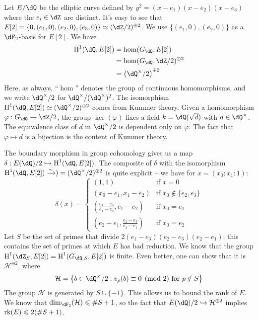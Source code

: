 \documentclass{article}
\begin{document}
\begin{example}[descent]
Let $E/\dQ$ be the elliptic curve defined by $y^2=(x-e_1)(x-e_2)(x-e_3)$ where 
the $e_i\in \dZ$ are distinct. It's easy to see that 
$E[2]=\{0,(e_1,0),(e_2,0),(e_3,0)\}\simeq (\dZ/2)^{\oplus 2}$. We use 
$\{(e_1,0),(e_2,0)\}$ as a $\dF_2$-basis for $E[2]$. We have 
\begin{align*}
  \h^1(\dQ,E[2]) &= \hom(G_\dQ,E[2]) \\
    &= \hom(G_\dQ,\dZ/2)^{\oplus 2} \\
    &= \left(\dQ^\times/2\right)^{\oplus 2}
\end{align*}
Here, as always, ``$\hom$'' denotes the group of continuous homomorphisms, and 
we write $\dQ^\times/2$ for $\dQ^\times/(\dQ^\times)^2$. The isomorphism 
$\h^1(\dQ,E[2])\simeq (\dQ^\times/2)^{\oplus 2}$ comes from Kummer theory. 
Given a homomorphism $\varphi:G_\dQ\to \dZ/2$, the group $\ker(\varphi)$ 
fixes a field $k=\dQ(\sqrt d)$ with $d\in \dQ^\times$. The equivalence class of 
$d$ in $\dQ^\times/2$ is dependent only on $\varphi$. The fact that 
$\varphi\mapsto d$ is a bijection is the content of Kummer theory. 

The boundary morphism in group cohomology gives us a map 
$\delta:E(\dQ)/2 \hookrightarrow \h^1(\dQ,E[2])$. The 
composite of $\delta$ with the isomorphism 
$\h^1(\dQ,E[2])\xrightarrow\sim )=(\dQ^\times/2)^{\oplus 2}$ is quite explicit 
-- we have for $x=(x_0:x_1:1)$:
\[
  \delta(x) 
    = \begin{cases}
        (1,1)             & \text{if $x=0$} \\
        (x_0-e_1,x_1-e_2) & \text{if $x_0\notin \{e_2,e_3\}$} \\
        \left(\frac{e_1-e_3}{e_1-e_2},e_1-e_2\right) & \text{if $x_0=e_1$} \\
        \left(e_2-e_1,\frac{e_2-e_3}{e_2-e_1}\right) & \text{if $x_0=e_2$}
      \end{cases}
\]
Let $S$ be the set of primes that divide $2(e_1-e_3)(e_2-e_3)(e_2-e_1)$; this 
contains the set of primes at which $E$ has bad reduction. We know that the 
group $\h^1(\dZ_S,E[2]) = \h^1(G_{\dQ,S},E[2])$ is finite. Even better, one can 
show that it is $\mathcal H^{\oplus 2}$, where 
\[
  \mathcal H = \left\{b\in \dQ^\times/2 : \text{$v_p(b)\equiv 0\pmod 2$ for $p\notin S$}\right\}
\]
The group $\mathcal H$ is generated by $S\cup\{-1\}$. This allows us to bound 
the rank of $E$. We know that $\dim_{\dF_2}(\mathcal H)\leqslant \# S+1$, so 
the fact that $E(\dQ)/2\hookrightarrow \mathcal H^{\oplus 2}$ implies 
$\operatorname{rk}(E) \leqslant 2(\# S+1)$. 


\end{example}
\end{document}
